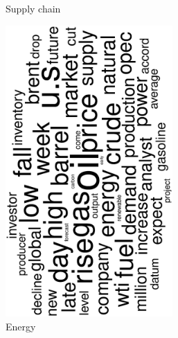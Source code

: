 \begin{figure}
\begin{subfigure}{0.32\textwidth}
		\caption{Supply chain}
	\end{subfigure}
	\begin{subfigure}{0.32\textwidth}
		\includegraphics[width=0.7\textwidth,angle=270]{figures/wordcloud1.eps}
		\caption{Energy}
	\end{subfigure}
	\begin{subfigure}{0.32\textwidth}

\end{subfigure}
\end{figure}
